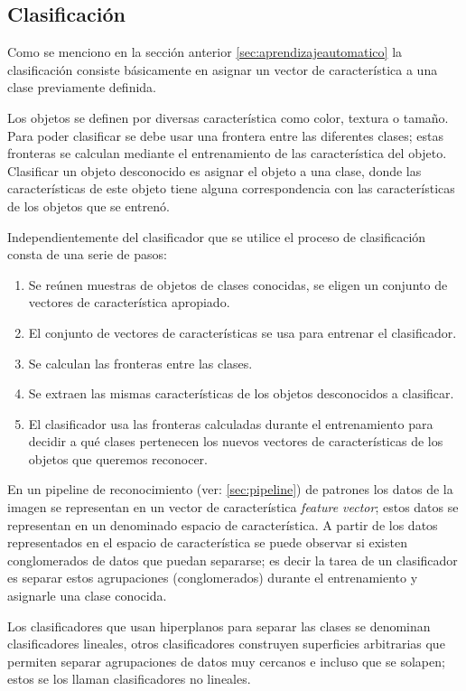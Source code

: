 \subsection{Clasificación}\label{sub:clasificacion}
Como se menciono en la sección anterior \ref{sec:aprendizajeautomatico} la clasificación consiste básicamente en asignar un vector de característica a una clase previamente definida.

Los objetos se definen por diversas característica como color, textura o tamaño. Para poder clasificar se debe usar una frontera entre las diferentes clases; estas fronteras se calculan mediante el entrenamiento de las característica del objeto. Clasificar un objeto desconocido es asignar el objeto a una clase, donde las características de este objeto tiene alguna correspondencia con las características de los objetos que se entrenó. 

Independientemente del clasificador que se utilice el proceso de clasificación consta de una serie de pasos:
\begin{enumerate}
\item Se reúnen muestras de objetos de clases conocidas, se eligen un conjunto de vectores de característica apropiado.
\item El conjunto de vectores de características se usa para entrenar el clasificador. 
\item Se calculan las fronteras entre las clases. 
\item Se extraen las mismas características de los objetos desconocidos a clasificar.
\item El clasificador usa las fronteras calculadas durante el entrenamiento para decidir a qué clases pertenecen los nuevos vectores de características de los objetos que queremos reconocer.
\end{enumerate}

En un pipeline de reconocimiento (ver: \ref{sec:pipeline}) de patrones los datos de la imagen se representan en un vector de característica 
\textit{feature vector}; estos datos se representan en un denominado espacio de característica. A partir de los datos representados en el espacio de característica se puede observar si existen conglomerados de datos que puedan separarse; es decir la tarea de un clasificador es separar estos agrupaciones (conglomerados) durante el entrenamiento y asignarle una clase conocida.


Los clasificadores que usan hiperplanos para separar las clases se denominan clasificadores lineales, otros clasificadores construyen superficies arbitrarias que permiten separar agrupaciones de datos muy cercanos e incluso que se solapen; estos se los llaman clasificadores no lineales. 

